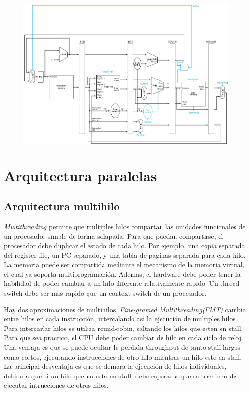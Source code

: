 \documentclass{article}
\begin{document}
\begin{figure}[h!]
    \includegraphics[width=\linewidth]{imagenes/pipeline/pipeline-control.png}
\end{figure}

\newpage
\section{Arquitectura paralelas}

\subsection{Arquitectura multihilo}

\textit{Multithreading} permite que multiples hilos compartan las unidades funcionales de un procesador simple de forma solapada. Para que puedan compartirse, el procesador debe duplicar el estado de cada hilo.
Por ejemplo, una copia separada del register file, un PC separado, y una tabla de paginas separada para cada hilo.
La memoria puede ser compartida mediante el mecanismo de la memoria virtual, el cual ya soporta multiprogramación.
Ademas, el hardware debe poder tener la habilidad de poder cambiar a un hilo diferente relativamente rapido. Un thread switch debe ser mas rapido que un context switch de un procesador.

Hay dos aproximaciones de multihilos, \textit{Fine-grained Multithreading(FMT)} cambia entre hilos en cada instrucción, intercalando asi la ejecución de multiples hilos. Para intercarlar hilos se utiliza round-robin, saltando los hilos que esten en stall. Para que sea practico, el CPU debe poder cambiar de hilo en cada ciclo de reloj.
Una ventaja es que se puede ocultar la perdida throughput de tanto stall largos como cortos, ejecutando instrucciones de otro hilo mientras un hilo este en stall. 
La principal desventaja es que se demora la ejecución de hilos individuales, debido a que si un hilo que no esta en stall, debe esperar a que se terminen de ejecutar intrucciones de otros hilos.
\end{document}
